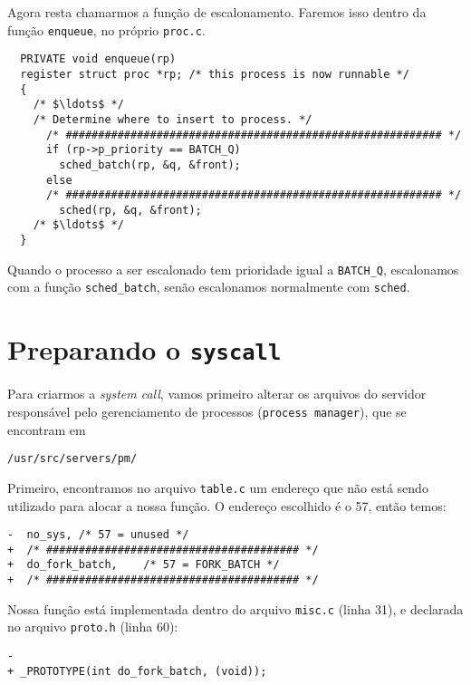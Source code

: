 \documentclass{amsart}
\theoremstyle{plain}
\newcommand{\code}[1]{\lstinline[mathescape=true]{#1}}
\begin{document}
Agora resta chamarmos a função de escalonamento. Faremos isso dentro da função \code{enqueue}, no
próprio \code{proc.c}.

\begin{verbatim}
  PRIVATE void enqueue(rp)
  register struct proc *rp; /* this process is now runnable */
  {
    /* $\ldots$ */
    /* Determine where to insert to process. */
      /* ########################################################## */
      if (rp->p_priority == BATCH_Q)
        sched_batch(rp, &q, &front);
      else
      /* ########################################################## */
        sched(rp, &q, &front);
    /* $\ldots$ */
  }
\end{verbatim}

Quando o processo a ser escalonado tem prioridade igual a \code{BATCH_Q}, escalonamos com a função
\code{sched_batch}, senão escalonamos normalmente com \code{sched}.

\section{Preparando o \code{syscall}}

Para criarmos a \textit{system call}, vamos primeiro alterar os arquivos do servidor responsável
pelo gerenciamento de processos (\code{process manager}), que se encontram em

\begin{lstlisting}[frame=leftline,mathescape=true,style=nonumbers]
/usr/src/servers/pm/
\end{lstlisting}

Primeiro, encontramos no arquivo \code{table.c} um endereço que não está sendo utilizado para
alocar a nossa função. O endereço escolhido é o 57, então temos:

\begin{lstlisting}[frame=leftline,mathescape=true,style=nonumbers]
-  no_sys, /* 57 = unused */
+  /* ####################################### */
+  do_fork_batch,    /* 57 = FORK_BATCH */
+  /* ####################################### */
\end{lstlisting}

Nossa função está implementada dentro do arquivo \code{misc.c} (linha 31), e declarada no arquivo
\code{proto.h} (linha 60):

\begin{lstlisting}[frame=leftline,mathescape=true,style=nonumbers]
-
+ _PROTOTYPE(int do_fork_batch, (void));
\end{lstlisting}
\end{document}
